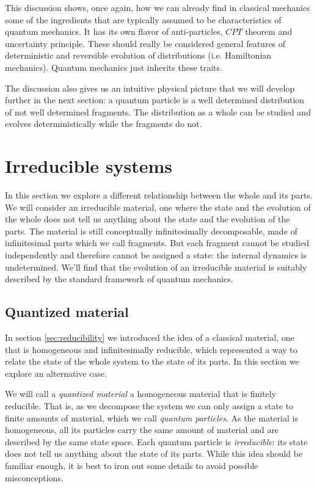 \documentclass[smallextended]{svjour3}
\numberwithin{equation}{section}
\theoremstyle{definition}
\begin{document}
This discussion shows, once again, how we can already find in classical mechanics some of the ingredients that are typically assumed to be characteristics of quantum mechanics. It has its own flavor of anti-particles, $CPT$ theorem and uncertainty principle. These should really be considered general features of deterministic and reversible evolution of distributions (i.e. Hamiltonian mechanics). Quantum mechanics just inherits these traits.

The discussion also gives us an intuitive physical picture that we will develop further in the next section: a quantum particle is a well determined distribution of not well determined fragments. The distribution as a whole can be studied and evolves deterministically while the fragments do not.

\section{Irreducible systems}
\label{sec:irreducibility}

In this section we explore a different relationship between the whole and its parts. We will consider an irreducible material, one where the state and the evolution of the whole does not tell us anything about the state and the evolution of the parts. The material is still conceptually infinitesimally decomposable, made of infinitesimal parts which we call fragments. But each fragment cannot be studied independently and therefore cannot be assigned a state: the internal dynamics is undetermined. We'll find that the evolution of an irreducible material is suitably described by the standard framework of quantum mechanics.

\subsection{Quantized material}

In section \ref{sec:reducibility} we introduced the idea of a classical material, one that is homogeneous and infinitesimally reducible, which represented a way to relate the state of the whole system to the state of its parts. In this section we explore an alternative case.

We will call a \emph{quantized material} a homogeneous material that is finitely reducible. That is, as we decompose the system we can only assign a state to finite amounts of material, which we call \emph{quantum particles}. As the material is homogeneous, all its particles carry the same amount of material and are described by the same state space. Each quantum particle is \textit{irreducible}: its state does not tell us anything about the state of its parts. While this idea should be familiar enough, it is best to iron out some details to avoid possible misconceptions.
\end{document}

